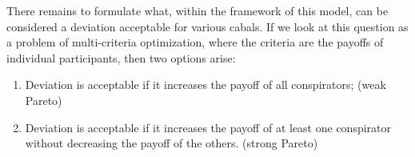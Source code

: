 There remains to formulate what, within the framework of this model, can be considered a deviation acceptable for various cabals. If we look at this question as a problem of multi-criteria optimization, where the criteria are the payoffs of individual participants, then two options arise: %
\begin{enumerate}
	\item Deviation is acceptable if it increases the payoff of all conspirators; (weak Pareto) %
	\item Deviation is acceptable if it increases the payoff of at least one conspirator without decreasing the payoff of the others. (strong Pareto) %
\end{enumerate}

